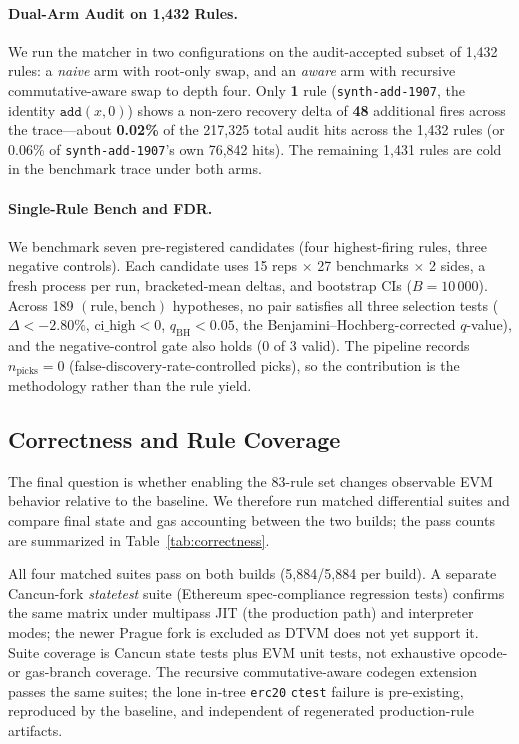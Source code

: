 \paragraph{Dual-Arm Audit on 1{,}432 Rules.}
{\sloppy
We run the matcher in two configurations on the audit-accepted subset
of 1{,}432 rules: a \emph{naive} arm with root-only swap, and an
\emph{aware} arm with recursive commutative-aware swap to depth four.
Only \textbf{1} rule (\texttt{synth-add-1907}, the identity
$\texttt{add}(x, 0)$) shows a non-zero recovery delta of \textbf{48}
additional fires across the trace---about \textbf{0.02\%} of the
217{,}325 total audit hits across the 1{,}432 rules (or 0.06\% of
\texttt{synth-add-1907}'s own 76{,}842 hits). The remaining 1{,}431
rules are cold in the benchmark trace under both arms.\par}

\paragraph{Single-Rule Bench and FDR.}
We benchmark seven pre-registered candidates (four highest-firing rules,
three negative controls). Each candidate uses 15 reps $\times$ 27
benchmarks $\times$ 2 sides, a fresh process per run, bracketed-mean
deltas, and bootstrap CIs ($B{=}10\,000$). Across 189
$(\text{rule},\text{bench})$ hypotheses, no pair satisfies all three
selection tests ($\Delta{<}{-}2.80\%$, $\text{ci\_high}{<}0$,
$q_{\text{BH}}{<}0.05$, the Benjamini--Hochberg-corrected $q$-value),
and the negative-control gate also holds (0 of 3 valid). The pipeline
records $n_{\text{picks}}=0$ (false-discovery-rate-controlled picks),
so the contribution is the methodology rather than the rule yield.

\subsection{Correctness and Rule Coverage}
\label{sec:correctness}

The final question is whether enabling the 83-rule set changes
observable EVM behavior relative to the baseline. We therefore run
matched differential suites and compare final state and gas accounting
between the two builds; the pass counts are summarized in
Table~\ref{tab:correctness}.


\FloatBarrier

All four matched suites pass on both builds (5{,}884/5{,}884 per build). A
separate Cancun-fork \emph{statetest} suite (Ethereum spec-compliance
regression tests) confirms the same matrix under multipass JIT (the
production path) and interpreter modes; the newer Prague fork is
excluded as DTVM does not yet support it. Suite coverage is Cancun state tests plus EVM unit tests, not
exhaustive opcode- or gas-branch coverage. The recursive commutative-aware
codegen extension passes the same suites; the lone in-tree \texttt{erc20}
\texttt{ctest} failure is pre-existing, reproduced by the baseline, and
independent of regenerated production-rule artifacts.
